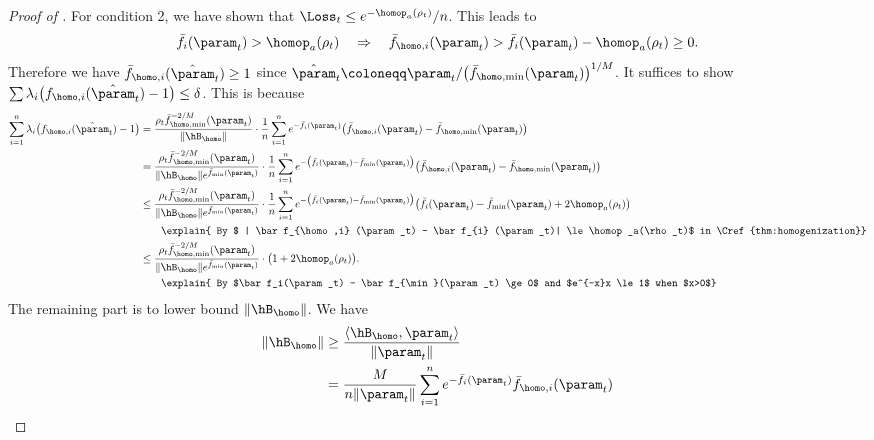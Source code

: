 \begin{proof}[Proof of ]
  For condition 2, we have shown that $\Loss_t \le e^{-\homop_a(\rho_t)}/n$. This leads to 
\[\bar f_i(\param_t)> \homop_a(\rho_t)\quad \Rightarrow\quad \bar f_{\homo,i}(\param_t) > \bar f_i(\param_t) - \homop_a(\rho_t) \ge 0.\] 
Therefore we have $\bar f_{\homo,i}(\hat \param_t ) \ge 1$ since $\hat \param_t \coloneqq \param_t  / \big(\bar f_{\homo,\min} (\param_t )\big)^{1 / M}$. It suffices to show $\sum \lambda_i \big( f_{\homo,i}(\hat \param_t ) -1 \big) \le \delta$. This is because
\begin{align}
    \label{eq: KKT cond2 verify}
    \sum_{i=1}^n \lambda_i \big( f_{\homo,i}(\hat \param_t ) -1 \big) 
    & =  \frac{\rho_t \bar f_{\homo,\min}^{-2 /M}(\param_t )}{\| \hB_{\homo}\|} \cdot \frac{1}{n}  \sum_{i=1}^n e^{-\bar f_i(\param_t )} \big(\bar f_{\homo,i}(\param_t ) - \bar f_{\homo,\min}(\param_t ) \big)  \notag\\ 
    & = \frac{\rho_t \bar f_{\homo,\min}^{-2 /M}(\param_t )}{\| \hB_{\homo}\| e^{ \bar f_{\min}(\param_t)}}\cdot \frac{1}{n}  \sum_{i=1}^n e^{-\big(\bar f_i(\param_t)- \bar f_{\min}(\param_t) \big)} \big(\bar f_{\homo,i}(\param_t) - \bar f_{\homo,\min}(\param_t) \big)  \notag\\ 
    &\le \frac{\rho_t \bar f_{\homo,\min}^{-2 /M}(\param_t )}{\| \hB_{\homo}\| e^{ \bar f_{\min}(\param_t )}}\cdot \frac{1}{n}  \sum_{i=1}^n e^{-\big(\bar f_{i}(\param_t)- \bar f_{\min}(\param_t) \big) } \big(\bar f_{i}(\param_t) - \bar f_{\min}(\param_t) + 2\homop_a(\rho_t) \big)\notag\\ 
    & \qquad \explain{ By $ | \bar f_{\homo,i} (\param_t) - \bar f_{i} (\param_t)| \le \homop_a(\rho_t)$ in  \Cref{thm:homogenization}} \notag\\ 
    &\le \frac{\rho_t \bar f_{\homo,\min}^{-2 /M}(\param_t )}{\| \hB_{\homo}\| e^{ \bar f_{\min}(\param_t)}}\cdot  \big(1+ 2\homop_a(\rho_t) \big). \\ 
    &\qquad \explain{ By $\bar f_i(\param_t) - \bar f_{\min}(\param_t) \ge 0$ and $e^{-x}x \le 1$ when $x>0$} \notag 
\end{align}
The remaining part is to lower bound $\| \hB_{\homo}\|$. We have 
\begin{align*}
\|\hB_{\homo}\| &\ge \frac{\langle \hB_{\homo}, \param_t\rangle }{\|\param_t\|} \\
&= \frac{M}{n \|\param_t\|} \sum_{i=1}^{n} e^{-\bar f_i(\param_t)} \bar f_{\homo,i} (\param_t)\\

\end{align*}
\end{proof}
